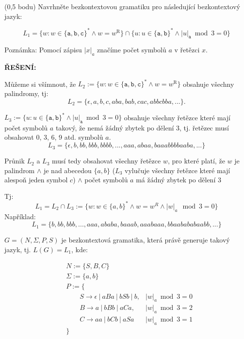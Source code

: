 \documentclass[10pt]{article}
\begin{document}
\noindent

\noindent
(0,5 bodu) Navrhněte bezkontextovou gramatiku pro následující bezkontextový jazyk:

$$L_1 = \{ w : w \in \{ \mathtt{a, b, c} \}^* \wedge w = w^\mathrm{R} \} \cap \{ u : u \in \{ \mathtt{a,b} \}^* \wedge |u|_{\mathtt{a}} \bmod 3 = 0 \} $$

\noindent
Poznámka: Pomocí zápisu $|x|_a$ značíme počet symbolů $a$ v řetězci $x$.

\begin{description}
   \item 
    \textbf{ŘEŠENÍ:} 
    
        Můžeme si všímnout, že $L_2 := \{ w : w \in \{ \mathtt{a, b, c} \}^* \wedge w = w^\mathrm{R} \}$ obsahuje všechny palindromy, tj:
        $$L_2 = \{\epsilon, a, b, c, aba, bab, cac, abbcbba, ... \}.$$

        $L_3 := \{ u : u \in \{ \mathtt{a,b} \}^* \wedge |u|_{\mathtt{a}} \bmod 3 = 0 \} $ obsahuje všechny řetězce které mají počet symbolů $a$ takový, že nemá žádný zbytek po dělení 3, tj. řetězec musí obsahovat 0, 3, 6, 9 atd. symbolů $a$.
        $$L_3 =  \{\epsilon, b,bb, bbb, bbbb, ..., aaa, abaa, baaabbbbaaba, ...  \}$$

        Průnik $L_2$ a $L_3$ musí tedy obsahovat všechny řetězce $w$, pro které platí, že $w$ je palindrom $\land$ je nad abecedou $\{a, b\}$ ($L_3$ vylučuje všechny řetězce které mají alespoň jeden symbol $c$) $\land$ počet symbolů $a$ má žádný zbytek po dělení 3

        Tj:
        $$L_1 = L_2 \cap L_3 := \{w : w \in \{a, b\}^* \land w = w^R \land |w|_a\ \bmod 3 = 0 \}$$
        Například:
        $$L_1 =\{ b, bb, bbb, ..., aaa, ababa, baaab, aaabaaa, bbaabababaabb, ...\}$$
        
       $ G = (N, \Sigma, P, S ) $ je bezkontextová gramatika, která právě generuje takový jazyk, tj. $L(G) = L_1$, kde:

       
       \begin{align*}
       & N := \{ S, B, C\}  \\
       & \Sigma := \{a, b\} \\
       & P := \{ \\
       & \qquad S \rightarrow \epsilon\ |\ aBa\ |\ bSb\ |\ b, & |w|_a \bmod 3 = 0\\
       & \qquad B \rightarrow a\ |\ bBb\ |\ aCa, & |w|_a \bmod 3 = 2\\
       & \qquad C \rightarrow aa\ |\ bCb\ |\ aSa & |w|_a \bmod 3 = 1\\
       & \}
       \end{align*}
       

\end{description}
\end{document}
